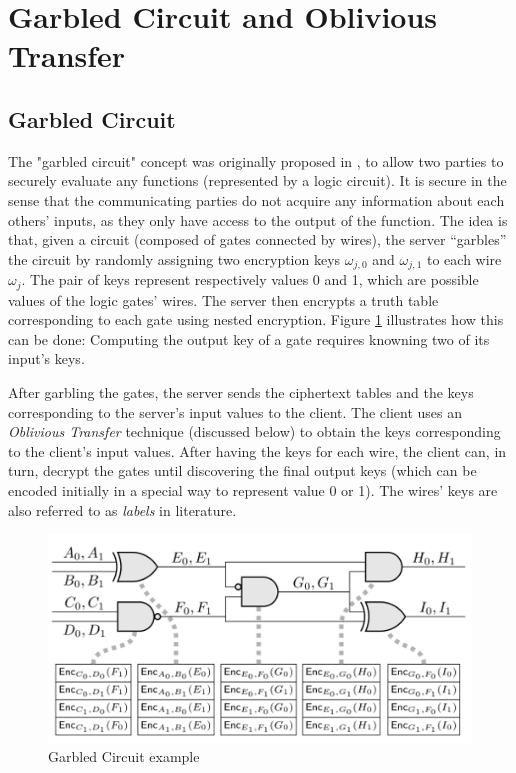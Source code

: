 \section{Garbled Circuit and Oblivious Transfer}
\label{sec:defMPP}

\subsection{Garbled Circuit}
\label{sec:garbledCircuitPre}

The "garbled circuit" concept was originally proposed in \cite{yao1986generate}, to
allow two parties to securely evaluate any functions (represented by a logic
circuit). It is secure in the sense that the communicating parties do not acquire
any information about each others' inputs, as they only have access to the output of the
function. The idea is that, given a circuit (composed of gates connected by
wires), the server ``garbles'' the circuit by randomly assigning two encryption
keys \(\omega_{j,0}\) and \(\omega_{j,1}\) to each wire \(\omega_{j}\). The pair
of keys represent respectively values 0 and 1, which are possible values of the
logic gates' wires. The server then encrypts a truth table corresponding to each
gate using nested encryption. Figure \ref{fig:garbledCircuit} illustrates how
this can be done: Computing the output key of a gate requires knowning two of
its input's keys.

After garbling the gates, the server sends the ciphertext tables and the keys corresponding to the server's input values to the client. The client uses an
\textit{Oblivious Transfer } technique (discussed below) to obtain the keys
corresponding to the client's input values. After having the keys for each wire,
the client can, in turn, decrypt the gates until discovering the final output keys
(which can be encoded initially in a special way to represent value 0 or 1). The
wires' keys are also referred to as \textit{labels} in literature.

\begin{figure}[htbp!] 
  \centering    
  \includegraphics[width=1.0\textwidth]{Chapter2/Figs/Raster/garbledCircuit}
  \caption{Garbled Circuit example}
  \label{fig:garbledCircuit}
\end{figure}

